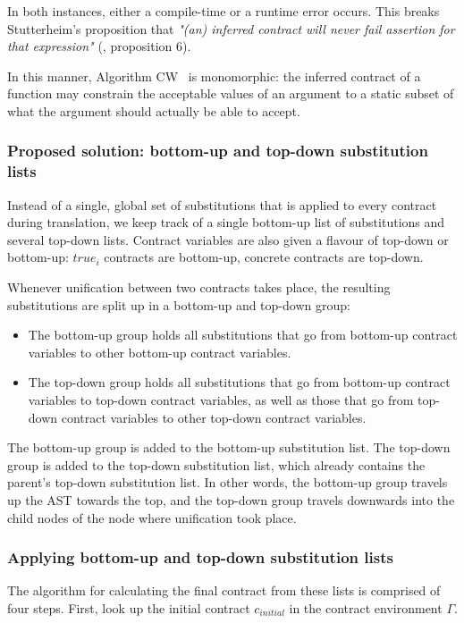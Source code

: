 \documentclass[10pt]{report}
\begin{document}
{In both instances, either a compile-time or a runtime error occurs.
This breaks Stutterheim's proposition that \textit{"(an) inferred contract will never fail assertion for that expression"} (\cite{Stutterheim:2013:thesis}, proposition 6). 

In this manner, Algorithm CW ~is monomorphic: the inferred contract of a function may constrain the acceptable values of an argument to a static subset of what the argument should actually be able to accept.

\subsubsection{Proposed solution: bottom-up and top-down substitution lists}

Instead of a single, global set of substitutions that is applied to every contract during translation, we keep track of a single bottom-up list of substitutions and several top-down lists.
Contract variables are also given a flavour of top-down or bottom-up: $true_i$ contracts are bottom-up, concrete contracts are top-down.

Whenever unification between two contracts takes place, the resulting substitutions are split up in a bottom-up and top-down group:
\begin{itemize}
\item The bottom-up group holds all substitutions that go from bottom-up contract variables to other bottom-up contract variables.
\item The top-down group holds all substitutions that go from bottom-up contract variables to top-down contract variables, as well as those that go from top-down contract variables to other top-down contract variables.
\end{itemize}

The bottom-up group is added to the bottom-up substitution list.
The top-down group is added to the top-down substitution list, which already contains the parent's top-down substitution list.
In other words, the bottom-up group travels up the AST towards the top, and the top-down group travels downwards into the child nodes of the node where unification took place.

\subsubsection{Applying bottom-up and top-down substitution lists}

The algorithm for calculating the final contract from these lists is comprised of four steps.
First, look up the initial contract $c_{initial}$ in the contract environment $\Gamma$.

}
\end{document}

